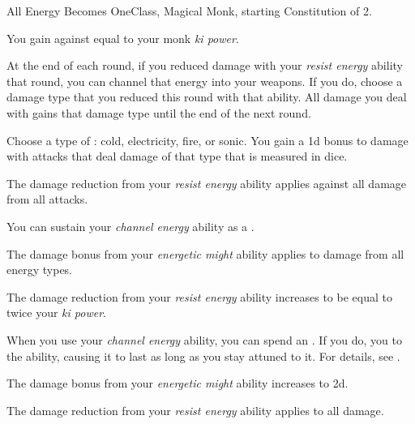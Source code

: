     \begin{feat}{All Energy Becomes One}{Class, Magical}
        \featpre Monk, starting Constitution of 2.

         You gain  against  equal to your monk \textit{ki power}.

         At the end of each round, if you reduced damage with your \textit{resist energy} ability that round, you can channel that energy into your weapons.
        If you do, choose a damage type that you reduced this round with that ability.
        All damage you deal with  gains that damage type until the end of the next round.

         Choose a type of : cold, electricity, fire, or sonic.
        You gain a \plus1d bonus to damage with attacks that deal damage of that type that is measured in dice.

         The damage reduction from your \textit{resist energy} ability applies against all damage from all  attacks.

         You can sustain your \textit{channel energy} ability as a .

         The damage bonus from your \textit{energetic might} ability applies to damage from all energy types.

         The damage reduction from your \textit{resist energy} ability increases to be equal to twice your \textit{ki power}.

         When you use your \textit{channel energy} ability, you can spend an .
        If you do, you  to the ability, causing it to last as long as you stay attuned to it.
        For details, see .

         The damage bonus from your \textit{energetic might} ability increases to \plus2d.

         The damage reduction from your \textit{resist energy} ability applies to all damage.
    \end{feat}

